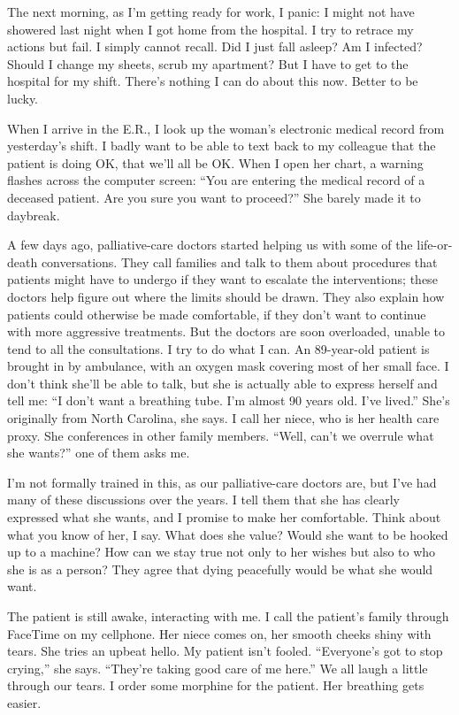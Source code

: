 The next morning, as I'm getting ready for work, I panic: I might not
have showered last night when I got home from the hospital. I try to
retrace my actions but fail. I simply cannot recall. Did I just fall
asleep? Am I infected? Should I change my sheets, scrub my apartment?
But I have to get to the hospital for my shift. There's nothing I can do
about this now. Better to be lucky.

When I arrive in the E.R., I look up the woman's electronic medical
record from yesterday's shift. I badly want to be able to text back to
my colleague that the patient is doing OK, that we'll all be OK. When I
open her chart, a warning flashes across the computer screen: ``You are
entering the medical record of a deceased patient. Are you sure you want
to proceed?'' She barely made it to daybreak.

A few days ago, palliative-care doctors started helping us with some of
the life-or-death conversations. They call families and talk to them
about procedures that patients might have to undergo if they want to
escalate the interventions; these doctors help figure out where the
limits should be drawn. They also explain how patients could otherwise
be made comfortable, if they don't want to continue with more aggressive
treatments. But the doctors are soon overloaded, unable to tend to all
the consultations. I try to do what I can. An 89-year-old patient is
brought in by ambulance, with an oxygen mask covering most of her small
face. I don't think she'll be able to talk, but she is actually able to
express herself and tell me: ``I don't want a breathing tube. I'm almost
90 years old. I've lived.'' She's originally from North Carolina, she
says. I call her niece, who is her health care proxy. She conferences in
other family members. ``Well, can't we overrule what she wants?'' one of
them asks me.

I'm not formally trained in this, as our palliative-care doctors are,
but I've had many of these discussions over the years. I tell them that
she has clearly expressed what she wants, and I promise to make her
comfortable. Think about what you know of her, I say. What does she
value? Would she want to be hooked up to a machine? How can we stay true
not only to her wishes but also to who she is as a person? They agree
that dying peacefully would be what she would want.

The patient is still awake, interacting with me. I call the patient's
family through Face­Time on my cellphone. Her niece comes on, her smooth
cheeks shiny with tears. She tries an upbeat hello. My patient isn't
fooled. ``Everyone's got to stop crying,'' she says. ``They're taking
good care of me here.'' We all laugh a little through our tears. I order
some morphine for the patient. Her breathing gets easier.

